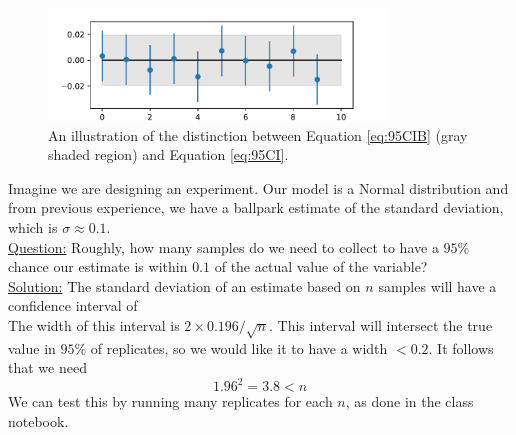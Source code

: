 \begin{itemize}
\begin{figure}[h]
\centering
\includegraphics[width=0.8\textwidth]{./../figures/notes3CI}
\caption{An illustration of the distinction between Equation \ref{eq:95CIB} (gray shaded region) and Equation \ref{eq:95CI}.   }\label{fig:CI}
\end{figure}

\begin{example}[Estimating CI]
Imagine we are designing an experiment. Our model is a Normal distribution and from previous experience, we have a ballpark estimate of the standard deviation, which is $\sigma \approx 0.1$.  \\



\noindent
\underline{Question:} Roughly, how many samples do we need to collect to have a $95\%$ chance our estimate is within $0.1$ of the actual value of the variable?\\



\noindent
\underline{Solution:} The standard deviation of an estimate based on $n$ samples will have a confidence interval of 
\begin{equation*}
[\hat{\mu}-0.196/\sqrt{n},\hat{\mu} +  0.196/\sqrt{n}]
\end{equation*}
The width of this interval is $2 \times 0.196/\sqrt{n}$. This interval will intersect the true value in $95\%$ of replicates, so we would like it to have a width $<0.2$. It follows that we need 
\begin{equation*}
1.96^2 = 3.8 < n 
\end{equation*}
We can test this by running many replicates for each $n$, as done in the class notebook. 
\end{example}
\end{itemize}



